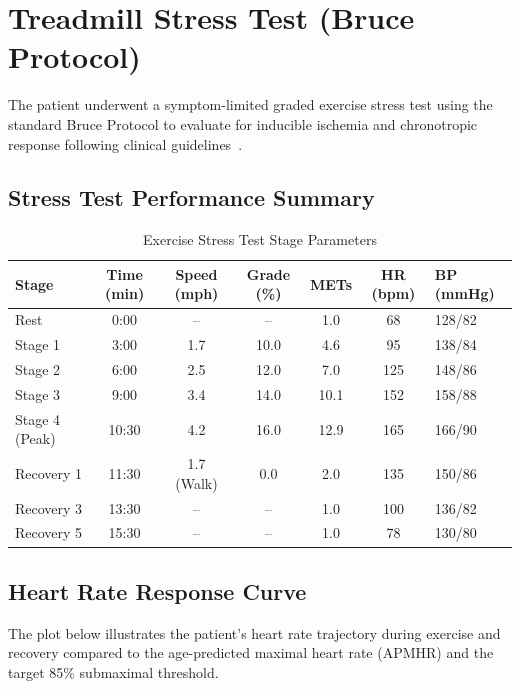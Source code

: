 \section{Treadmill Stress Test (Bruce Protocol)}

The patient underwent a symptom-limited graded exercise stress test using the standard Bruce Protocol to evaluate for inducible ischemia and chronotropic response following clinical guidelines~\cite{gibbons2002acc}.

\subsection{Stress Test Performance Summary}

\begin{table}[H]
\centering
\caption{Exercise Stress Test Stage Parameters}
\label{tab:stress_stages}
\begin{tabularx}{\textwidth}{l c c c c c X}
\toprule
\textbf{Stage} & \textbf{Time (min)} & \textbf{Speed (mph)} & \textbf{Grade (\%)} & \textbf{METs} & \textbf{HR (bpm)} & \textbf{BP (mmHg)} \\
\midrule
Rest & 0:00 & -- & -- & 1.0 & 68 & 128/82 \\
Stage 1 & 3:00 & 1.7 & 10.0 & 4.6 & 95 & 138/84 \\
Stage 2 & 6:00 & 2.5 & 12.0 & 7.0 & 125 & 148/86 \\
Stage 3 & 9:00 & 3.4 & 14.0 & 10.1 & 152 & 158/88 \\
Stage 4 (Peak) & 10:30 & 4.2 & 16.0 & 12.9 & 165 & 166/90 \\
Recovery 1 & 11:30 & 1.7 (Walk) & 0.0 & 2.0 & 135 & 150/86 \\
Recovery 3 & 13:30 & -- & -- & 1.0 & 100 & 136/82 \\
Recovery 5 & 15:30 & -- & -- & 1.0 & 78 & 130/80 \\
\bottomrule
\end{tabularx}
\end{table}

\subsection{Heart Rate Response Curve}
The plot below illustrates the patient's heart rate trajectory during exercise and recovery compared to the age-predicted maximal heart rate (APMHR) and the target 85\% submaximal threshold.

